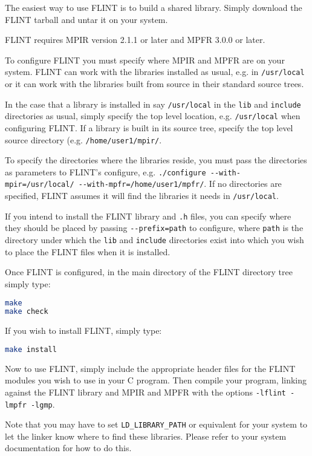 \documentclass[a4paper,10pt]{book}
\newcommand{\code}{\lstinline}
\begin{document}
The easiest way to use FLINT is to build a shared library.  Simply download 
the FLINT tarball and untar it on your system.

FLINT requires MPIR version 2.1.1 or later and MPFR 3.0.0 or later.

To configure FLINT you must specify where MPIR and MPFR are on
your system. FLINT can work with the libraries installed as usual,
e.g. in \code{/usr/local} or it can work with the libraries built
from source in their standard source trees. 

In the case that a library is installed in say \code{/usr/local}
in the \code{lib} and \code{include} directories as usual, simply
specify the top level location, e.g. \code{/usr/local} when 
configuring FLINT. If a library is built in its source tree,
specify the top level source directory (e.g. \code{/home/user1/mpir/}.

To specify the directories where the libraries reside, you must
pass the directories as parameters to FLINT's configure, e.g.
\code{./configure --with-mpir=/usr/local/ --with-mpfr=/home/user1/mpfr/}.
If no directories are specified, FLINT assumes it will find the
libraries it needs in \code{/usr/local}.

If you intend to install the FLINT library and \code{.h} files, 
you can specify where they should be placed by passing 
\code{--prefix=path} to configure, where \code{path} is the directory
under which the \code{lib} and \code{include} directories exist into
which you wish to place the FLINT files when it is installed.

Once FLINT is configured, in the main directory of the FLINT directory 
tree simply type:
\begin{lstlisting}[language=bash]
make
make check
\end{lstlisting}

If you wish to install FLINT, simply type:
\begin{lstlisting}[language=bash]
make install
\end{lstlisting}

Now to use FLINT, simply include the appropriate header files for 
the FLINT modules you wish to use in your C program.  Then compile 
your program, linking against the FLINT library and MPIR and MPFR 
with the options \code{-lflint -lmpfr -lgmp}.

Note that you may have to set \code{LD_LIBRARY_PATH} or equivalent
for your system to let the linker know where to find these libraries.
Please refer to your system documentation for how to do this.
\end{document}
